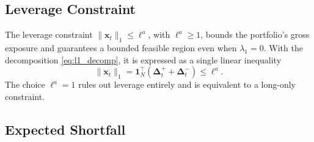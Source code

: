 \subsection{Leverage Constraint} \label{app:leverage}

The leverage constraint $\|\bm{x}_t\|_1 \le \ell^a$, with $\ell^a \ge 1$, bounds the portfolio's
gross exposure and guarantees a bounded feasible region even when $\lambda_1 = 0$. With
the decomposition \eqref{eq:l1_decomp}, it is expressed as a single linear inequality
\begin{equation} \label{eq:leverage_constraint}
    \|\bm{x}_t\|_1 = \bm{1}_N^\top (\bm{\Delta}_t^+ + \bm{\Delta}_t^-) \le \ell^a.
\end{equation}
The choice $\ell^a = 1$ rules out leverage entirely and is equivalent to a long-only constraint.

\subsection{Expected Shortfall} \label{app:reg_qp}

